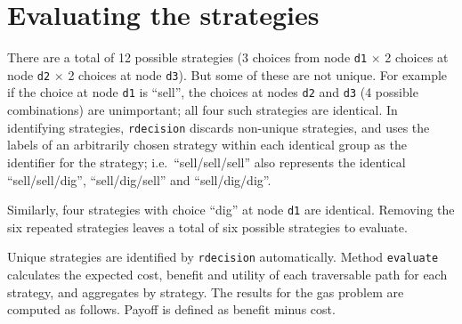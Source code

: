 \documentclass[]{article}
\newenvironment{Shaded}{\begin{snugshade}}{\end{snugshade}}
\newcommand{\CommentTok}[1]{\textcolor[rgb]{0.56,0.35,0.01}{\textit{#1}}}
\newcommand{\DataTypeTok}[1]{\textcolor[rgb]{0.13,0.29,0.53}{#1}}
\newcommand{\DecValTok}[1]{\textcolor[rgb]{0.00,0.00,0.81}{#1}}
\newcommand{\KeywordTok}[1]{\textcolor[rgb]{0.13,0.29,0.53}{\textbf{#1}}}
\newcommand{\NormalTok}[1]{#1}
\newcommand{\OperatorTok}[1]{\textcolor[rgb]{0.81,0.36,0.00}{\textbf{#1}}}
\newcommand{\StringTok}[1]{\textcolor[rgb]{0.31,0.60,0.02}{#1}}
\begin{document}
\begin{Shaded}
\end{Shaded}

\hypertarget{evaluating-the-strategies}{%
\section{Evaluating the strategies}\label{evaluating-the-strategies}}

There are a total of 12 possible strategies (3 choices from node
\texttt{d1} \(\times\) 2 choices at node \texttt{d2} \(\times\) 2
choices at node \texttt{d3}). But some of these are not unique. For
example if the choice at node \texttt{d1} is ``sell'', the choices at
nodes \texttt{d2} and \texttt{d3} (4 possible combinations) are
unimportant; all four such strategies are identical. In identifying
strategies, \texttt{rdecision} discards non-unique strategies, and uses
the labels of an arbitrarily chosen strategy within each identical group
as the identifier for the strategy; i.e.~``sell/sell/sell'' also
represents the identical ``sell/sell/dig'', ``sell/dig/sell'' and
``sell/dig/dig''.

Similarly, four strategies with choice ``dig'' at node \texttt{d1} are
identical. Removing the six repeated strategies leaves a total of six
possible strategies to evaluate.

Unique strategies are identified by \texttt{rdecision} automatically.
Method \texttt{evaluate} calculates the expected cost, benefit and
utility of each traversable path for each strategy, and aggregates by
strategy. The results for the gas problem are computed as follows.
Payoff is defined as benefit minus cost.
\end{document}
